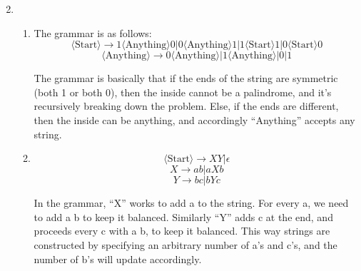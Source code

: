 
\usepackage{amsmath, verbatim, tikz, float}

\usetikzlibrary{arrows,automata}

\oddsidemargin 0in
\evensidemargin 0in
\textwidth 6.5in
\topmargin -0.5in
\textheight 9.0in
\newcommand{\norm}[1]{\left\lVert #1 \right\rVert}


\pagestyle{myheadings}

\begin{enumerate}
  \setcounter{enumi}{1} 
\item
  \begin{enumerate}
    \item
      The grammar is as follows:
      $$\langle \text{Start} \rangle \longrightarrow 1\langle\text{Anything}\rangle 0| 0\langle\text{Anything}\rangle 1| 1\langle\text{Start}\rangle 1|0 \langle\text{Start}\rangle 0$$
      $$\langle \text{Anything} \rangle \longrightarrow 0\langle\text{Anything}\rangle | 1\langle\text{Anything}\rangle | 0 | 1$$

      The grammar is basically that if the ends of the string are symmetric (both 1 or both 0), then the inside cannot be a palindrome, and it's recursively breaking down the problem. Else, if the ends are different, then the inside can be anything, and accordingly ``Anything'' accepts any string.

    \item
      $$\langle \text{Start} \rangle \longrightarrow XY | \epsilon$$
      $$X \longrightarrow ab | aXb$$
      $$Y \longrightarrow bc | bYc$$

      In the grammar, ``X'' works to add a to the string. For every a, we need to add a b to keep it balanced. Similarly ``Y'' adds c at the end, and proceeds every c with a b, to keep it balanced. This way strings are constructed by specifying an arbitrary number of a's and c's, and the number of b's will update accordingly.
  \end{enumerate}

\end{enumerate}
